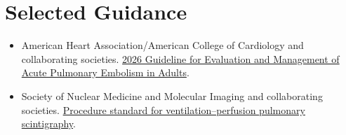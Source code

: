 \section*{Selected Guidance}
\begin{itemize}
  \item American Heart Association/American College of Cardiology and collaborating societies. \href{https://www.ahajournals.org/doi/pdf/10.1161/CIR.0000000000001415}{2026 Guideline for Evaluation and Management of Acute Pulmonary Embolism in Adults}.
  \item Society of Nuclear Medicine and Molecular Imaging and collaborating societies. \href{https://doi.org/10.2967/jnmt.126.273453}{Procedure standard for ventilation--perfusion pulmonary scintigraphy}.
\end{itemize}

\clearpage
